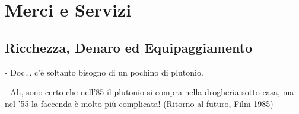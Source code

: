 \section{Merci e Servizi}

\subsection{Ricchezza, Denaro ed Equipaggiamento}

\begin{enfasi}{
- Doc... c'è soltanto bisogno di un pochino di plutonio.

\medskip

- Ah, sono certo che nell'85 il plutonio si compra nella drogheria sotto casa, ma nel '55 la faccenda è molto più complicata! (Ritorno al futuro, Film 1985)}
\end{enfasi}

